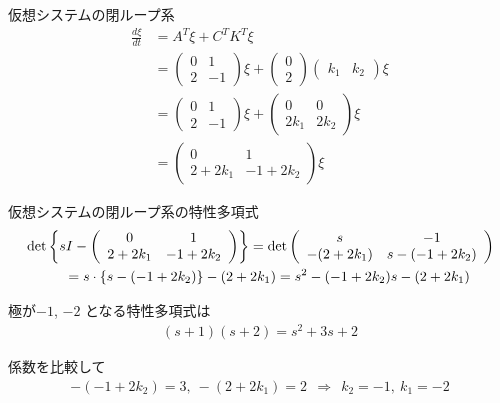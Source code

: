 \documentclass[a4paper,11pt]{jreport}
\def\det{\mathop{\rm det}\nolimits}
\begin{document}
仮想システムの閉ループ系
\begin{align*}
 \frac{d \xi}{dt} & = A^T \xi + C^T K^T \xi
\\
	&=
	\left (
	\begin{array}{cc}
	 0 & 1 \\
	 2 & -1
	\end{array}
	\right )
	\xi
	+
	\left (
	\begin{array}{c}
	 0 \\ 2 
	\end{array}
	\right )
	\left ( \begin{array}{cc}
		k_1 & k_2 
	\end{array} \right )
	\xi
\\
	&=
	\left (
	\begin{array}{cc}
	 0 & 1 \\
	 2 & -1
	\end{array}
	\right )
	\xi
	+
	\left (
	\begin{array}{cc}
	 0 & 0 \\ 2k_1 & 2k_2 
	\end{array}
	\right )
	\xi
\\
	&=
	\left (
	\begin{array}{cc}
	 0 & 1 \\
	 2 + 2k_1 & -1 + 2k_2
	\end{array}
	\right )
	\xi
\end{align*}

仮想システムの閉ループ系の特性多項式
\begin{align*}
	&\det
	\left \{
		sI- 
		\left ( 
		\begin{array}{cc}
		 0 & 1 \\
		 2 + 2k_1 & -1 + 2k_2
		\end{array}
		\right )
	\right \}
	=
	\det
	\left ( 
	\begin{array}{cc}
	 s & -1 \\
	 -(2 + 2k_1) & s-(-1 + 2k_2)
	\end{array}
	\right )
\\
	& \hspace{1cm} =
	s \cdot \{ s-(-1 + 2k_2) \} -(2 + 2k_1)
	=
	s^2 -(-1 + 2k_2)s -(2 + 2k_1)
\end{align*}

極が$-1$, $-2$ となる特性多項式は
\begin{align*}
	(s+1)(s+2) = s^2+3s+2
\end{align*}

係数を比較して
\begin{align*}
	-(-1 + 2k_2)=3, \ -(2 + 2k_1)=2 
	\ \ \Rightarrow \ \ 
	k_2=-1, \ k_1=-2
\end{align*}
\end{document}
